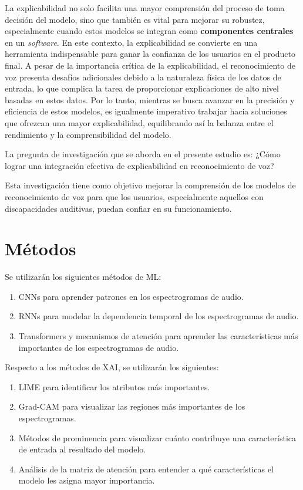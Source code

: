 \documentclass[conference]{IEEEtran}
\begin{document}
La explicabilidad no solo facilita una mayor comprensión del proceso de toma decisión del modelo, sino que también es vital para mejorar su robustez, especialmente cuando estos modelos se integran como \textbf{componentes centrales} en un \textit{software}. En este contexto, la explicabilidad se convierte en una herramienta indispensable para ganar la confianza de los usuarios en el producto final. A pesar de la importancia crítica de la explicabilidad, el reconocimiento de voz presenta desafíos adicionales debido a la naturaleza física de los datos de entrada, lo que complica la tarea de proporcionar explicaciones de alto nivel basadas en estos datos. Por lo tanto, mientras se busca avanzar en la precisión y eficiencia de estos modelos, es igualmente imperativo trabajar hacia soluciones que ofrezcan una mayor explicabilidad, equilibrando así la balanza entre el rendimiento y la comprensibilidad del modelo. 

La pregunta de investigación que se aborda en el presente estudio es: ¿Cómo lograr una integración efectiva de explicabilidad en reconocimiento de voz?

Esta investigación tiene como objetivo mejorar la comprensión de los modelos de reconocimiento de voz para que los usuarios, especialmente aquellos con discapacidades auditivas, puedan confiar en su funcionamiento.


\section{Métodos}

Se utilizarán los siguientes métodos de ML:

\begin{enumerate}
    \item CNNs para aprender patrones en los espectrogramas de audio.
    \item RNNs para modelar la dependencia temporal de los espectrogramas de audio.
    \item Transformers y mecanismos de atención \cite{vaswani2023attention} para aprender las características más importantes de los espectrogramas de audio.
\end{enumerate}

Respecto a los métodos de XAI, se utilizarán los siguientes:

\begin{enumerate}
    \item LIME \cite{ribeiro2016why} para identificar los atributos más importantes.
    \item Grad-CAM \cite{DBLP:journals/corr/SelvarajuDVCPB16} para visualizar las regiones más importantes de los espectrogramas.
    \item Métodos de prominencia para visualizar cuánto contribuye una característica de entrada al resultado del modelo.
    \item Análisis de la matriz de atención para entender a qué características el modelo les asigna mayor importancia.
\end{enumerate}

\printbibliography
\end{document}
